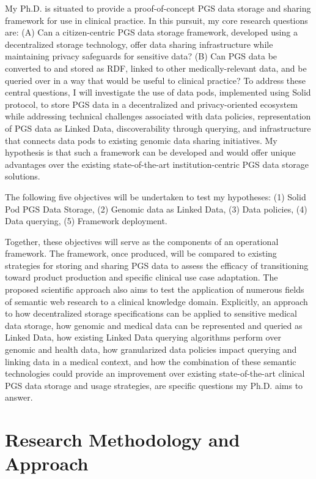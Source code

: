 \documentclass[runningheads]{llncs}
\begin{document}
My Ph.D. is situated to provide a proof-of-concept PGS data storage and sharing framework for use in clinical practice. 
In this pursuit, my core research questions are: 
(A) Can a citizen-centric PGS data storage framework, developed using a decentralized storage technology, offer data sharing infrastructure while maintaining privacy safeguards for sensitive data? 
(B) Can PGS data be converted to and stored as RDF, linked to other medically-relevant data, and be queried over in a way that would be useful to clinical practice?
To address these central questions, I will investigate the use of data pods, implemented using Solid protocol, to store PGS data in a decentralized and privacy-oriented ecosystem while addressing technical challenges associated with data policies, representation of PGS data as Linked Data, discoverability through querying, and infrastructure that connects data pods to existing genomic data sharing initiatives. 
My hypothesis is that such a framework can be developed and would offer unique advantages over the existing state-of-the-art institution-centric PGS data storage solutions. 

The following five objectives will be undertaken to test my hypotheses:
(1) Solid Pod PGS Data Storage, 
(2) Genomic data as Linked Data,
(3) Data policies,
(4) Data querying,
(5) Framework deployment.

Together, these objectives will serve as the components of an operational framework. 
The framework, once produced, will be compared to existing strategies for storing and sharing PGS data to assess the efficacy of transitioning toward product production and specific clinical use case adaptation.
The proposed scientific approach also aims to test the application of numerous fields of semantic web research to a clinical knowledge domain. 
Explicitly, an approach to how decentralized storage specifications can be applied to sensitive medical data storage, how genomic and medical data can be represented and queried as Linked Data, how existing Linked Data querying algorithms perform over genomic and health data, how granularized data policies impact querying and linking data in a medical context, and how the combination of these semantic technologies could provide an improvement over existing state-of-the-art clinical PGS data storage and usage strategies, are specific questions my Ph.D. aims to answer.


\section{Research Methodology and Approach}
\begin{comment}
Describe the research methodology you will apply in your research, including the different steps from the formulation of your research questions to answering them. Also describe the approach you are taking (or you intend to take for Early Stage Ph.D. submissions) to instantiate the research methodology, hence contributing to solve the problem described in Section 3 and confirm or reject your hypothesis. Discuss how this approach is innovative and novel, and how it is (might be) implemented.
\end{comment}
\end{document}
